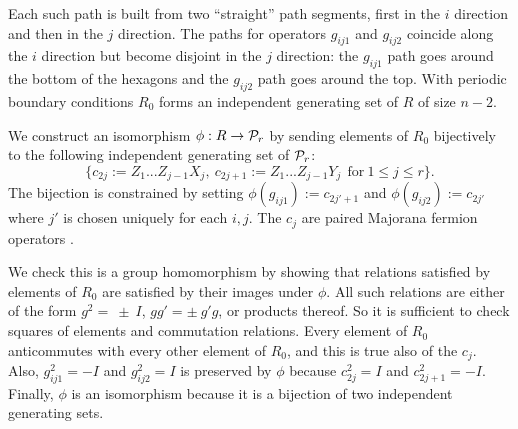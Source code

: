 Each such path is built from two ``straight''
path segments, first in the $i$ direction
and then in the $j$ direction. 
The paths for operators $g_{ij1}$ and
$g_{ij2}$ coincide along the $i$ direction
but become disjoint in the $j$ direction:
the $g_{ij1}$ path goes around the bottom
of the hexagons and the $g_{ij2}$ path
goes around the top.
With periodic boundary conditions $R_0$ forms an
independent generating set of $R$ of size $n-2.$

We construct an isomorphism $\phi: R\to \mathcal{P}_r$
by sending elements of $R_0$ bijectively
to the following independent generating
set of $\mathcal{P}_r$:
$$
\big\{c_{2j}:=Z_1...Z_{j-1} X_j,\ c_{2j+1}:=Z_1...Z_{j-1} Y_j\ \ \mbox{for}\ 1\le j\le r\big\}.
$$
The bijection is constrained 
by setting $\phi(g_{ij1}):=c_{2j'+1}$
and $\phi(g_{ij2}):=c_{2j'}$
where $j'$ is chosen uniquely for each $i, j.$
The $c_j$ are paired Majorana fermion operators \cite{Kitaev2006}.


We check this is a group homomorphism by showing that relations
satisfied by elements of $R_0$ are satisfied by
their images under $\phi.$
All such relations are either of the form
$g^2=~\pm~I$, $gg'=\pm~g'g$, or
products thereof.
So it is sufficient to check squares of
elements and commutation relations.
Every element of $R_0$ anticommutes with
every other element of $R_0$, and this is true also
of the $c_j.$
Also, $g_{ij1}^2=-I$ and $g_{ij2}^2=I$ 
is preserved by $\phi$ because $c_{2j}^2=I$ and $c_{2j+1}^2=-I$.
Finally, $\phi$ is an isomorphism
because it is a bijection of two independent
generating sets.

